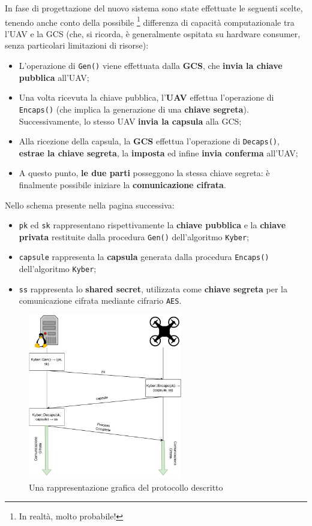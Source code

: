 \documentclass[a4paper, 12pt, oneside]{article}
\theoremstyle{definition}
\begin{document}
In fase di progettazione del nuovo sistema sono state effettuate le seguenti scelte, tenendo anche conto della possibile \footnote{In realtà, molto probabile!} differenza di capacità computazionale tra l'UAV e la GCS (che, si ricorda, è generalmente ospitata su hardware consumer, senza particolari limitazioni di risorse):

\begin{itemize}
    \item L'operazione di \texttt{Gen()} viene effettuata dalla \textbf{GCS}, che \textbf{invia la chiave pubblica} all'UAV;
    \item Una volta ricevuta la chiave pubblica, l'\textbf{UAV} effettua l'operazione di \texttt{Encaps()} (che implica la generazione di una \textbf{chiave segreta}). Successivamente, lo stesso UAV \textbf{invia la capsula} alla GCS;
    \item Alla ricezione della capsula, la \textbf{GCS} effettua l'operazione di \texttt{Decaps()}, \textbf{estrae la chiave segreta}, la \textbf{imposta} ed infine \textbf{invia conferma} all'UAV;
    \item A questo punto, \textbf{le due parti} posseggono la stessa chiave segreta: è finalmente possibile iniziare la \textbf{comunicazione cifrata}.
\end{itemize}

Nello schema presente nella pagina successiva:

\begin{itemize}
    \item \texttt{pk} ed \texttt{sk} rappresentano rispettivamente la \textbf{chiave pubblica} e la \textbf{chiave privata} restituite dalla procedura \texttt{Gen()} dell'algoritmo \texttt{Kyber};
    \item \texttt{capsule} rappresenta la \textbf{capsula} generata dalla procedura \texttt{Encaps()} dell'algoritmo \texttt{Kyber};
    \item \texttt{ss} rappresenta lo \textbf{shared secret}, utilizzata come \textbf{chiave segreta} per la comunicazione cifrata mediante cifrario \texttt{AES}.
\end{itemize}

\begin{figure}[H]
    \centering
    \includegraphics[width=0.6\textwidth]{images/key_exchange.pdf}
    \caption{Una rappresentazione grafica del protocollo descritto}
\end{figure}
\end{document}
